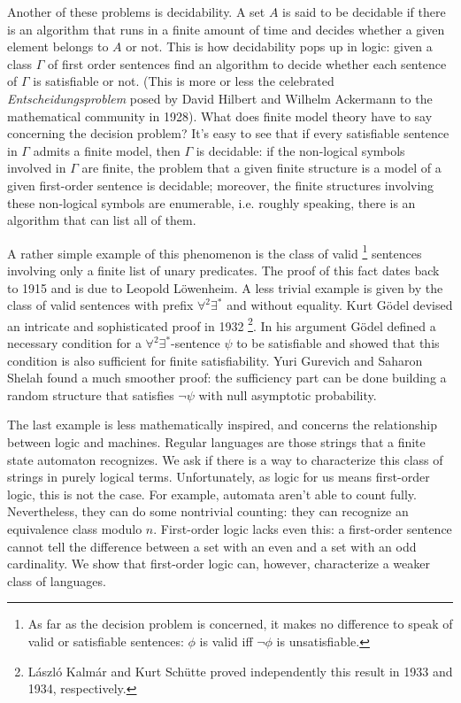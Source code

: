 Another of these problems is decidability. 
A set $A$ is said to be decidable if there is an algorithm that runs in a finite amount of time and decides whether a given element belongs to $A$ or not. 
This is how decidability pops up in logic: given a class $\Gamma$ of first order sentences find an algorithm to decide whether each sentence of $\Gamma$ is satisfiable or not. 
(This is more or less the celebrated \emph{Entscheidungsproblem} posed by David Hilbert and Wilhelm Ackermann to the mathematical community in 1928). 
What does finite model theory have to say concerning the decision problem? 
It's easy to see that if every satisfiable sentence in $\Gamma$ admits a finite model, then $\Gamma$ is decidable: if the non-logical symbols involved in $\Gamma$ are finite, the problem that a given finite structure is a model of a given first-order sentence is decidable; moreover, the finite structures involving these non-logical symbols are enumerable, i.e. roughly speaking, there is an algorithm that can list all of them. 

A rather simple example of this phenomenon is the class of valid
\footnote{As far as the decision problem is concerned, it makes no difference to speak of valid or satisfiable sentences: $\phi$ is valid iff $\lnot \phi$ is unsatisfiable.} 
sentences involving only a finite list of unary predicates. The proof of this fact dates back to 1915 and is due to Leopold L\"owenheim. 
A less trivial example is given by the class of valid sentences with prefix $\forall^2 \exists^{\ast}$ and without equality. 
Kurt G\"odel devised an intricate and sophisticated proof in 1932
\footnote{L\'aszl\'o Kalm\'ar and Kurt Sch\"utte proved independently this result in 1933 and 1934, respectively.}. 
In his argument G\"odel defined a necessary condition for a $\forall^2 \exists^{\ast}$-sentence $\psi$ to be satisfiable and showed that this condition is also sufficient for finite satisfiability. 
Yuri Gurevich and Saharon Shelah \cite{shelah} found a much smoother proof: the sufficiency part can be done building a random structure that satisfies $\lnot \psi$ with null asymptotic probability. 

The last example is less mathematically inspired, and concerns the relationship between logic and machines. 
Regular languages are those strings that a finite state automaton recognizes. 
We ask if there is a way to characterize this class of strings in purely logical terms. 
Unfortunately, as logic for us means first-order logic, this is not the case. 
For example, automata aren't able to count fully. 
Nevertheless, they can do some nontrivial counting: they can recognize an equivalence class modulo $n$. 
First-order logic lacks even this: a first-order sentence cannot tell the difference between a set with an even and a set with an odd cardinality. 
We show that first-order logic can, however, characterize a weaker class of languages. 
